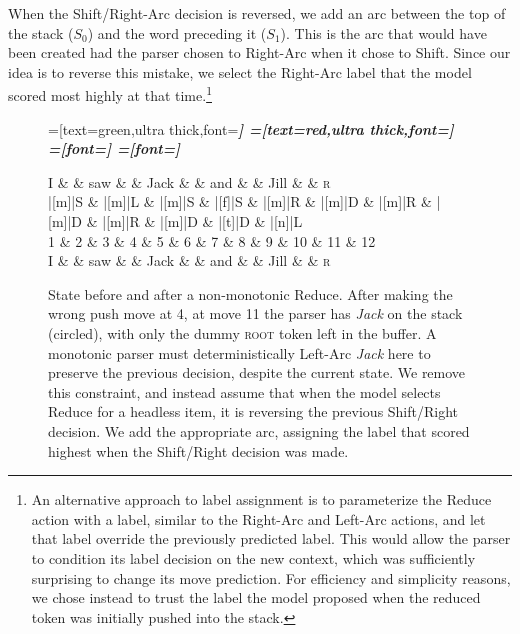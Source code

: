 \documentclass[11pt,letterpaper]{article}
\begin{document}
When the Shift/Right-Arc decision is reversed, we add an arc between the top
of the stack ($S_0$)
and the word preceding it ($S_1$). This is the arc that would have been created had the parser
chosen to Right-Arc when it chose to Shift. Since our idea is to reverse this mistake,
we select the Right-Arc label that the model scored most highly at that
time.\footnote{An alternative approach to label assignment is to parameterize
the Reduce action with a label, similar to the Right-Arc and Left-Arc actions,
and let that label override the previously predicted label. This would allow the
parser to condition its label decision on the new context, which was sufficiently
surprising to change its move prediction.
For efficiency and simplicity reasons, we chose instead to trust the label the model
proposed when the reduced token was initially pushed into the stack.}

\begin{figure}
    \centering
    \begin{dependency}[theme=simple]
    =[text=green,ultra thick,font=\bfseries\itshape]
    =[text=red,ultra thick,font=\bfseries\itshape]
    =[font=\bfseries\itshape]
    =[font=\itshape]
    \begin{deptext}[column sep=.075cm, row sep=.1ex]
        I \&           \& saw \&          \& Jack       \& \& and     \&           \& Jill \&   \& \textsc{r} \\
       |[m]|S \& |[m]|L \& |[m]|S   \& |[f]|S \& |[m]|R \& |[m]|D \& |[m]|R \& |[m]|D \& |[m]|R \& |[m]|D \& |[t]|D \& |[n]|L \\
            1 \&     2       \& 3  \&   4      \& 5          \& 6 \& 7     \& 8 \& 9 \& 10 \& 11 \& 12 \\
            I \&           \& saw \&          \& Jack       \& \& and     \&           \& Jill \& \& \textsc{r} \\
\end{deptext}
    
    
\end{dependency}
\caption{
State before and after a non-monotonic Reduce.
After making the wrong push move at 4, at move 11
the parser has \emph{Jack} on the stack (circled), with only the dummy \textsc{root}
token left in the buffer. A monotonic parser must deterministically Left-Arc
\emph{Jack} here to preserve the previous decision, despite the current state.
We remove this constraint, and instead assume that when the model selects Reduce
for a headless item, it is reversing the previous Shift/Right decision. We add
the appropriate arc, assigning the label that scored highest when the Shift/Right
decision was made.
\label{fig:adduce}}
\end{figure}
\end{document}
